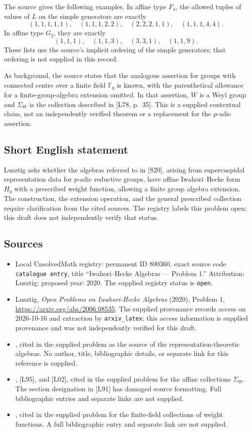\documentclass[11pt]{article}
\begin{document}
The source gives the following examples. In affine type \(F_4\), the allowed tuples of values of \(L\) on the simple generators are exactly
\[
(1,1,1,1,1),\quad(1,1,1,2,2),\quad(2,2,2,1,1),\quad(1,1,1,4,4).
\]
In affine type \(G_2\), they are exactly
\[
(1,1,1),\quad(1,1,3),\quad(3,3,1),\quad(1,1,9).
\]
These lists use the source's implicit ordering of the simple generators; that ordering is not supplied in this record.

As background, the source states that the analogous assertion for groups with connected centre over a finite field \(\mathbb F_q\) is known, with the parenthetical allowance for a finite-group-algebra extension omitted. In that assertion, \(W\) is a Weyl group and \(\Sigma_W\) is the collection described in [L78, p.\ 35]. This is a supplied contextual claim, not an independently verified theorem or a replacement for the \(p\)-adic assertion.
\subsection{Short English statement}
Lusztig asks whether the algebras referred to in [S20], arising from supercuspidal representation data for \(p\)-adic reductive groups, have affine Iwahori--Hecke form \(H_q\) with a prescribed weight function, allowing a finite group algebra extension. The construction, the extension operation, and the general prescribed collection require clarification from the cited sources. The registry labels this problem open; this draft does not independently verify that status.
\subsection{Sources}
\begin{itemize}
\item Local UnsolvedMath registry: permanent ID \(800360\), exact source code \texttt{catalogue entry}, title ``Iwahori--Hecke Algebras --- Problem 1.'' Attribution: Lusztig; proposed year: 2020. The supplied registry status is \texttt{open}.
\item Lusztig, \emph{Open Problems on Iwahori-Hecke Algebras} (2020), Problem 1, \url{https://arxiv.org/abs/2006.08535}. The supplied provenance records access on 2026-10-16 and extraction by \texttt{arxiv\_latex}; this access information is supplied provenance and was not independently verified for this draft.
\item [S20], cited in the supplied problem as the source of the representation-theoretic algebras. No author, title, bibliographic details, or separate link for this reference is supplied.
\item [L91, section 17], [L95], and [L02], cited in the supplied problem for the affine collections \(\Sigma_W\). The section designation in [L91] has damaged source formatting. Full bibliographic entries and separate links are not supplied.
\item [L78, p.\ 35], cited in the supplied problem for the finite-field collections of weight functions. A full bibliographic entry and separate link are not supplied.
\end{itemize}
\end{document}
